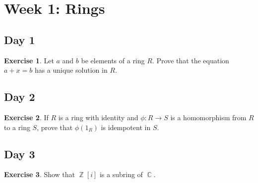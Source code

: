 \documentclass{article}
\theoremstyle{definition}
\newtheorem*{exercise}{Exercise}
\DeclareMathOperator{\Z}{\mathbb{Z}}
\DeclareMathOperator{\C}{\mathbb{C}}
\begin{document}

\section*{Week 1: Rings}

\subsection*{Day 1}
\begin{exercise}
    Let \(a\) and \(b\) be elements of a ring \(R\). Prove that the equation \(a+x=b\) has a unique solution in \(R\).
\end{exercise}

\subsection*{Day 2}
\begin{exercise}
    If \(R\) is a ring with identity and \(\phi:R\to S\) is a homomorphism from \(R\) to a ring \(S\), prove that \(\phi(1_R)\) is idempotent in \(S\).
\end{exercise}

\subsection*{Day 3}
\begin{exercise}
    Show that \(\Z[i]\) is a subring of \(\C\).
\end{exercise}
\end{document}
